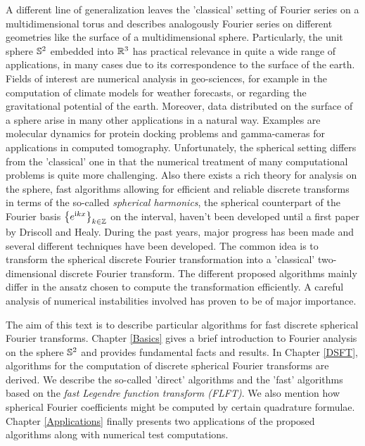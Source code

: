 A different line of generalization leaves the 'classical' setting of 
Fourier series on a multidimensional torus and describes analogously
Fourier series on different geometries like the surface of a
multidimensional sphere. Particularly, the unit sphere $\mathbb{S}^2$ 
embedded into $\mathbb{R}^3$ has practical relevance in quite a wide range of 
applications, in many cases due to its correspondence to the surface 
of the earth. Fields of interest are numerical analysis in
geo-sciences, for example in the computation of climate models for
weather forecasts, or regarding the gravitational potential of the 
earth. Moreover, data distributed on the surface of a sphere arise
in many other applications in a natural way. Examples are
molecular dynamics for protein docking problems and 
gamma-cameras for applications in computed tomography.
Unfortunately, the spherical setting differs from the 'classical' 
one in that the numerical treatment of many computational problems
is quite more challenging. Also there exists a rich theory for 
analysis on the sphere, fast algorithms allowing for efficient and
reliable discrete transforms in terms of the so-called 
\emph{spherical harmonics}, the spherical counterpart of the 
Fourier basis $\left\{e^{\mbox{\scriptsize\rm{i}} k x}\right\rbrace_{k \in \mathbb{Z}}$ on the interval,
haven't been developed until a first paper by Driscoll and Healy. 
During the past years, major progress has been made and several 
different techniques have been developed. The common idea is to
transform the spherical discrete Fourier transformation into a
'classical' two-dimensional discrete Fourier transform. The
different proposed algorithms mainly differ in the ansatz chosen
to compute the transformation efficiently. A careful analysis
of numerical instabilities involved has proven to be of major 
importance.

The aim of this text is to describe particular algorithms for fast discrete
spherical Fourier transforms. Chapter \ref{Basics} gives a brief 
introduction to Fourier analysis on the sphere $\mathbb{S}^2$ and 
provides fundamental facts and results.
In Chapter \ref{DSFT}, algorithms for the computation of discrete
spherical Fourier transforms are derived. We describe the
so-called 'direct' algorithms and the 'fast' algorithms based on
the \emph{fast Legendre function transform (FLFT)}. We also mention
how spherical Fourier coefficients might be computed by certain 
quadrature formulae. Chapter \ref{Applications} finally presents 
two applications of the proposed algorithms along with numerical
test computations.
